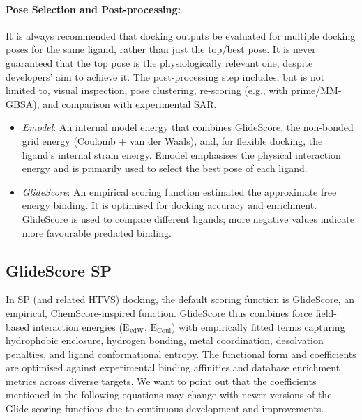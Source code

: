 \documentclass[12pt]{article}
\begin{document}
\paragraph{Pose Selection and Post-processing:}

It is always recommended that docking outputs be evaluated for multiple docking poses for the same ligand, rather than just the top/best pose. It is never guaranteed that the top pose is the physiologically relevant one, despite developers' aim to achieve it. The post-processing step includes, but is not limited to, visual inspection, pose clustering, re-scoring (e.g., with prime/MM-GBSA), and comparison with experimental SAR. 

\begin{itemize}
  \item \emph{Emodel}: An internal model energy that combines GlideScore, the non-bonded grid energy (Coulomb + van der Waals), and, for flexible docking, the ligand's internal strain energy. Emodel emphasises the physical interaction energy and is primarily used to select the best pose of each ligand.
  \item \emph{GlideScore}: An empirical scoring function estimated the approximate free energy binding. It is optimised for docking accuracy and enrichment. GlideScore is used to compare different ligands; more negative values indicate more favourable predicted binding\cite{CH7_Friesner2004b}.
\end{itemize}


\subsection{GlideScore SP}

In SP (and related HTVS) docking, the default scoring function is GlideScore, an empirical, ChemScore-inspired function\cite{CH7_Friesner2004a,CH7_Friesner2004b}. GlideScore thus combines force field-based interaction energies ($\textrm{E}_{\textrm{vdW}}$, $\textrm{E}_{\textrm{Coul}}$) with empirically fitted terms capturing hydrophobic enclosure, hydrogen bonding, metal coordination, desolvation penalties, and ligand conformational entropy. The functional form and coefficients are optimised against experimental binding affinities and database enrichment metrics across diverse targets\cite{CH7_Friesner2004b,CH7_Friesner2006}. We want to point out that the coefficients mentioned in the following equations may change with newer versions of the Glide scoring functions due to continuous development and improvements. 
\end{document}
